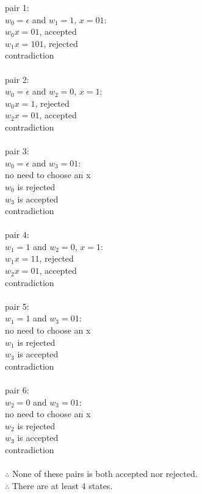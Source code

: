 \documentclass[12pt]{article}
\begin{document}
\begin{enumerate}
pair 1:\\
$w_{0}=\epsilon$ and $w_{1}=1$, $x=01$:\\
$w_{0}x=01$, accepted\\
$w_{1}x=101$, rejected\\
contradiction\\\\
pair 2:\\
$w_{0}=\epsilon$ and $w_{2}=0$, $x=1$:\\
$w_{0}x=1$, rejected\\
$w_{2}x=01$, accepted\\
contradiction\\\\
pair 3:\\
$w_{0}=\epsilon$ and $w_{3}=01$:\\
no need to choose an x\\
$w_{0}$ is rejected\\
$w_{3}$ is accepted\\
contradiction\\\\
pair 4:\\
$w_{1}=1$ and $w_{2}=0$, $x=1$:\\
$w_{1}x=11$, rejected\\
$w_{2}x=01$, accepted\\
contradiction\\\\
pair 5:\\
$w_{1}=1$ and $w_{3}=01$:\\
no need to choose an x\\
$w_{1}$ is rejected\\
$w_{3}$ is accepted\\
contradiction\\\\
pair 6:\\
$w_{2}=0$ and $w_{3}=01$:\\
no need to choose an x\\
$w_{2}$ is rejected\\
$w_{3}$ is accepted\\
contradiction\\\\
$\therefore$ None of these pairs is both accepted nor rejected.\\
$\therefore$ There are at least 4 states.\\



\end{enumerate}
\end{document}
